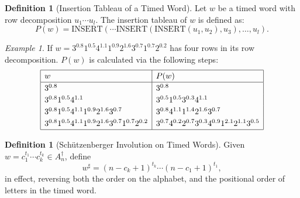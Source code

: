 \documentclass[10pt]{amsproc}
\theoremstyle{definition}
\newtheorem{definition}[theorem]{Definition}
\theoremstyle{remark}
\newtheorem{example}[theorem]{Example}
\newcommand{\ins}{\mathrm{INSERT}}
\begin{document}
\begin{definition}
  [Insertion Tableau of a Timed Word]
  Let $w$ be a timed word with row decomposition $u_1\dotsb u_l$.
  The insertion tableau of $w$ is defined as:
  \begin{displaymath}
    P(w) = \ins(\dotsb\ins(\ins(u_1, u_2),u_3),\dotsc,u_l).
  \end{displaymath}
\end{definition}
\begin{example}
  If $w=3^{0.8}1^{0.5}4^{1.1}1^{0.9}2^{1.6}3^{0.7}1^{0.7}2^{0.2}$ has four rows in its row decomposition.
  $P(w)$ is calculated via the following steps:
  \begin{displaymath}
    \renewcommand{\arraystretch}{1.2}
    \begin{array}{|l|l|}
      \hline
      w & P(w)\\
      \hline
      3^{0.8} & 3^{0.8}\\
      3^{0.8}1^{0.5}4^{1.1} & 3^{0.5}1^{0.5}3^{0.3}4^{1.1}\\
      3^{0.8}1^{0.5}4^{1.1}1^{0.9}2^{1.6}3^{0.7} & 3^{0.8}4^{1.1}1^{1.4}2^{1.6}3^{0.7}\\
      3^{0.8}1^{0.5}4^{1.1}1^{0.9}2^{1.6}3^{0.7}1^{0.7}2^{0.2} & 3^{0.7}4^{0.2}2^{0.7}3^{0.3}4^{0.9}1^{2.1}2^{1.1}3^{0.5}\\
      \hline
    \end{array}
    \renewcommand{\arraystretch}{1}
  \end{displaymath}
\end{example}
\begin{definition}
  [Sch\"utzenberger Involution on Timed Words]
  \label{definition:schuetzenberger-involution}
  Given $w=c_1^{t_1}\dotsb c_k^{t_k}\in A_n^\dagger$, define
  \begin{equation}
    \label{eq:sharp}
    w^\sharp = (n-c_k+1)^{t_k} \dotsb (n-c_1+1)^{t_1},
  \end{equation}
  in effect, reversing both the order on the alphabet, and the positional order of letters in the timed word.
\end{definition}
\end{document}
